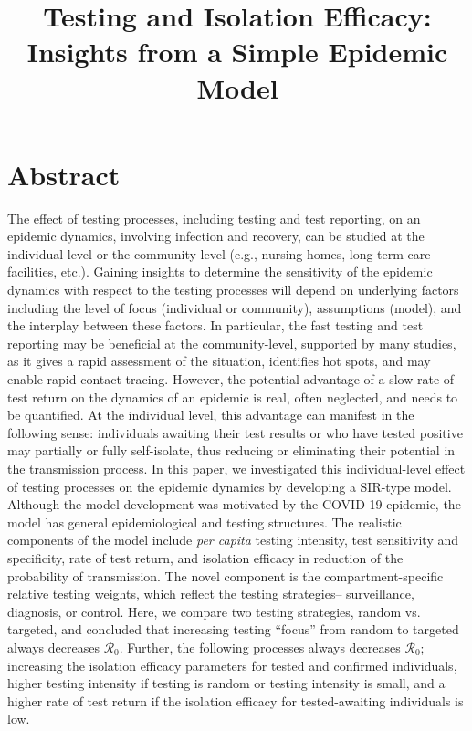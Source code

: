 \documentclass[12pt]{article}
\title{Testing and Isolation Efficacy: Insights from a Simple Epidemic Model}
\newcommand{\percap}{\emph{per capita}\xspace}
\newcommand{\Rnum}{\ensuremath{\mathcal{R}_0}}
\newcommand{\covid}{COVID-19\xspace}
\DeclareRobustCommand\_{\ifmmode\expandafter\subtxt\else\textunderscore\fi}
\theoremstyle{definition} %
\begin{document}
\maketitle

\linenumbers

\section{Abstract}

The effect of testing processes, including testing and test reporting, on an epidemic dynamics, involving infection and recovery, can be studied at the individual level or the community level (e.g., nursing homes, long-term-care facilities, etc.). 
Gaining insights to determine the sensitivity of the epidemic dynamics with respect to the testing processes will depend on underlying factors including the level of focus (individual or community), assumptions (model), and the interplay between these factors. 
In particular, the fast testing and test reporting may be beneficial at the community-level, supported by many studies, as it gives a rapid assessment of the situation, identifies hot spots, and may enable rapid contact-tracing. However, the potential advantage of a slow rate of test return on the dynamics of an epidemic is real, often neglected, and needs to be quantified. At the individual level, this advantage can manifest in the following sense: individuals awaiting their test results or who have tested positive may partially or fully self-isolate, thus reducing or eliminating their potential in the transmission process.
In this paper, we investigated this individual-level effect of testing processes on the epidemic dynamics by developing a SIR-type model.
Although the model development was motivated by the \covid epidemic, the model has general epidemiological and testing structures. The realistic components of the model include \percap testing intensity, test sensitivity and specificity, rate of test return, and isolation efficacy in reduction of the probability of transmission. The novel component is the compartment-specific relative testing weights, which reflect the testing strategies-- surveillance, diagnosis, or control. Here, we compare two testing strategies, random vs. targeted, and concluded that increasing testing “focus” from random to targeted always decreases \Rnum. Further, the following processes always decreases $\Rnum$; increasing the isolation efficacy parameters for tested and confirmed individuals, higher testing intensity if testing is random or testing intensity is small, and a higher rate of test return if the isolation efficacy for tested-awaiting individuals is low.
\end{document}
